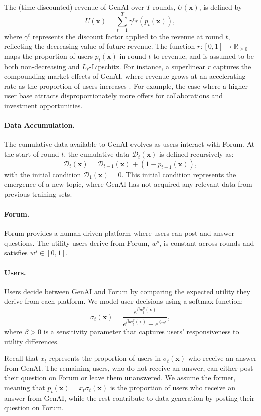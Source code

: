 The (time-discounted) revenue of GenAI over $T$ rounds, $U(\mathbf{x})$, is defined by  
\[
U(\mathbf{x}) = \sum_{t=1}^T \gamma^t r(p_t(\mathbf{x})),  
\]
where $\gamma^t$ represents the discount factor applied to the revenue at round $t$, reflecting the decreasing value of future revenue. The function $r : [0, 1] \to \mathbb{R}_{\geq 0}$ maps the proportion of users $p_t(\mathbf{x})$ in round $t$ to revenue, and is assumed to be both non-decreasing and $L_r$-Lipschitz. For instance, a superlinear $r$ captures the compounding market effects of GenAI, where revenue grows at an accelerating rate as the proportion of users increases \cite{katz1985network, bailey2022peer, mcintyre2017networks}. For example, the case where a higher user base attracts disproportionately more offers for collaborations and investment opportunities.

\paragraph{Data Accumulation.}  
The cumulative data available to GenAI evolves as users interact with Forum. At the start of round $t$, the cumulative data $\mathcal{D}_t(\mathbf{x})$ is defined recursively as:  
\[
\mathcal{D}_t(\mathbf{x}) = \mathcal{D}_{t-1}(\mathbf{x}) + (1 - p_{t-1}(\mathbf{x})),
\]  
with the initial condition $\mathcal{D}_1(\mathbf{x}) = 0$. This initial condition represents the emergence of a new topic, where GenAI has not acquired any relevant data from previous training sets.  

\paragraph{Forum.}  
Forum provides a human-driven platform where users can post and answer questions. The utility users derive from Forum, $w^s$, is constant across rounds and satisfies $w^s \in [0, 1]$.  

\paragraph{Users.}  
Users decide between GenAI and Forum by comparing the expected utility they derive from each platform. We model user decisions using a softmax function:  
\[
\sigma_t(\mathbf{x}) = \frac{e^{\beta w^g_t(\mathbf{x})}}{e^{\beta w^g_t(\mathbf{x})} + e^{\beta w^s}},
\]  
where $\beta > 0$ is a sensitivity parameter that captures users' responsiveness to utility differences.  

Recall that $x_t$ represents the proportion of users in $\sigma_t(\mathbf{x})$ who receive an answer from GenAI. The remaining users, who do not receive an answer, can either post their question on Forum or leave them unanswered. We assume the former, meaning that $p_t(\mathbf{x}) = x_t \sigma_t(\mathbf{x})$ is the proportion of users who receive an answer from GenAI, while the rest contribute to data generation by posting their question on Forum.


